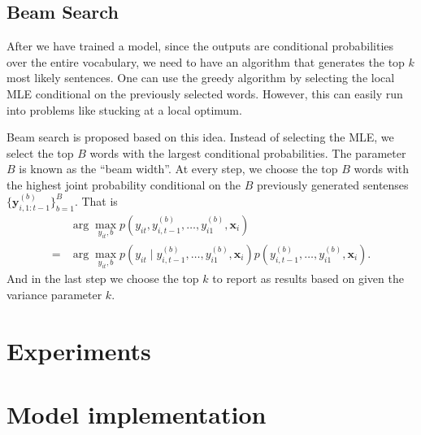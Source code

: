 \documentclass[12pt]{article}
\begin{document}
\subsection{Beam Search}
\label{sub:beam}
After we have trained a model, since the outputs are conditional probabilities over the entire vocabulary, we need to have an algorithm that generates the top $k$ most likely sentences. One can use the greedy algorithm by selecting the local MLE conditional on the previously selected words. However, this can easily run into problems like stucking at a local optimum.

Beam search is proposed based on this idea. Instead of selecting the MLE, we select the top $B$ words with the largest conditional probabilities. The parameter $B$ is known as the ``beam width''. At every step, we choose the top $B$ words with the highest joint probability conditional on the $B$ previously generated sentenses $\{\bm y_{i, 1:t-1}^{(b)}\}_{b=1}^B$. That is
\begin{align}
	&\arg \max_{y_{it}, b} p(y_{it}, y_{i,t-1}^{(b)}, \dots, y_{i1}^{(b)}, \bm x_i)\nonumber\\
	=& \arg \max_{y_{it}, b} p(y_{it} \mid y_{i,t-1}^{(b)}, \dots, y_{i1}^{(b)}, \bm x_i) p(y_{i,t-1}^{(b)}, \dots, y_{i1}^{(b)}, \bm x_i).
\end{align}
And in the last step we choose the top $k$ to report as results based on given the variance parameter $k$.

\section{Experiments}





\appendix
\section{Model implementation}
\end{document}

